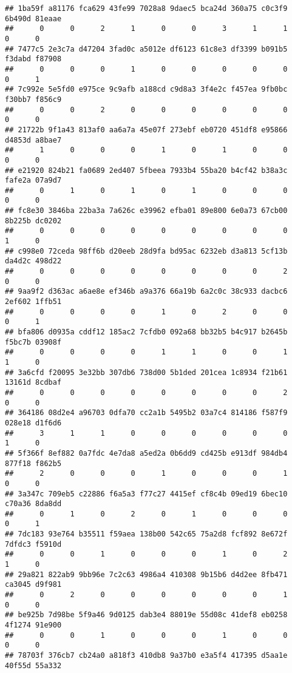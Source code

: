 \documentclass[
]{article}
\begin{document}
\begin{verbatim}
## 1ba59f a81176 fca629 43fe99 7028a8 9daec5 bca24d 360a75 c0c3f9 6b490d 81eaae 
##      0      0      2      1      0      0      3      1      1      0      0 
## 7477c5 2e3c7a d47204 3fad0c a5012e df6123 61c8e3 df3399 b091b5 f3dabd f87908 
##      0      0      0      1      0      0      0      0      0      0      1 
## 7c992e 5e5fd0 e975ce 9c9afb a188cd c9d8a3 3f4e2c f457ea 9fb0bc f30bb7 f856c9 
##      0      0      2      0      0      0      0      0      0      0      0 
## 21722b 9f1a43 813af0 aa6a7a 45e07f 273ebf eb0720 451df8 e95866 d4853d a8bae7 
##      1      0      0      0      1      0      1      0      0      0      0 
## e21920 824b21 fa0689 2ed407 5fbeea 7933b4 55ba20 b4cf42 b38a3c fafe2a 07a9d7 
##      0      1      0      1      0      1      0      0      0      0      0 
## fc8e30 3846ba 22ba3a 7a626c e39962 efba01 89e800 6e0a73 67cb00 8b225b dc0202 
##      0      0      0      0      0      0      0      0      0      1      0 
## c998e0 72ceda 98ff6b d20eeb 28d9fa bd95ac 6232eb d3a813 5cf13b da4d2c 498d22 
##      0      0      0      0      0      0      0      0      2      0      0 
## 9aa9f2 d363ac a6ae8e ef346b a9a376 66a19b 6a2c0c 38c933 dacbc6 2ef602 1ffb51 
##      0      0      0      0      1      0      2      0      0      0      1 
## bfa806 d0935a cddf12 185ac2 7cfdb0 092a68 bb32b5 b4c917 b2645b f5bc7b 03908f 
##      0      0      0      0      1      1      0      0      1      1      0 
## 3a6cfd f20095 3e32bb 307db6 738d00 5b1ded 201cea 1c8934 f21b61 13161d 8cdbaf 
##      0      0      0      0      0      0      0      0      2      0      0 
## 364186 08d2e4 a96703 0dfa70 cc2a1b 5495b2 03a7c4 814186 f587f9 028e18 d1f6d6 
##      3      1      1      0      0      0      0      0      0      1      0 
## 5f366f 8ef882 0a7fdc 4e7da8 a5ed2a 0b6dd9 cd425b e913df 984db4 877f18 f862b5 
##      2      0      0      0      1      0      0      0      1      0      0 
## 3a347c 709eb5 c22886 f6a5a3 f77c27 4415ef cf8c4b 09ed19 6bec10 c70a36 8da8dd 
##      0      1      0      2      0      1      0      0      0      0      1 
## 7dc183 93e764 b35511 f59aea 138b00 542c65 75a2d8 fcf892 8e672f 7dfdc3 f5910d 
##      0      0      1      0      0      0      1      0      2      1      0 
## 29a821 822ab9 9bb96e 7c2c63 4986a4 410308 9b15b6 d4d2ee 8fb471 ca3045 d9f981 
##      0      2      0      0      0      0      0      0      1      0      0 
## be925b 7d98be 5f9a46 9d0125 dab3e4 88019e 55d08c 41def8 eb0258 4f1274 91e900 
##      0      0      1      0      0      0      1      0      0      0      0 
## 78703f 376cb7 cb24a0 a818f3 410db8 9a37b0 e3a5f4 417395 d5aa1e 40f55d 55a332 

\end{verbatim}
\end{document}
